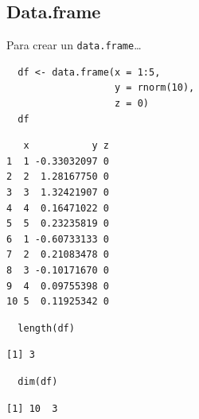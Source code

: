\documentclass[xcolor={usenames,svgnames,dvipsnames}]{beamer}
\begin{document}
\subsection{Data.frame}
\label{sec:orge6c545d}
\begin{frame}[fragile,label={sec:org3742b00}]{Para crear un \texttt{data.frame}\ldots{}}
 \lstset{language=r,label= ,caption= ,captionpos=b,numbers=none}
\begin{lstlisting}
  df <- data.frame(x = 1:5,
                   y = rnorm(10),
                   z = 0)
  df
\end{lstlisting}

\begin{verbatim}
   x           y z
1  1 -0.33032097 0
2  2  1.28167750 0
3  3  1.32421907 0
4  4  0.16471022 0
5  5  0.23235819 0
6  1 -0.60733133 0
7  2  0.21083478 0
8  3 -0.10171670 0
9  4  0.09755398 0
10 5  0.11925342 0
\end{verbatim}

\lstset{language=r,label= ,caption= ,captionpos=b,numbers=none}
\begin{lstlisting}
  length(df)
\end{lstlisting}

\begin{verbatim}
[1] 3
\end{verbatim}

\lstset{language=r,label= ,caption= ,captionpos=b,numbers=none}
\begin{lstlisting}
  dim(df)
\end{lstlisting}

\begin{verbatim}
[1] 10  3
\end{verbatim}
\end{frame}
\end{document}
